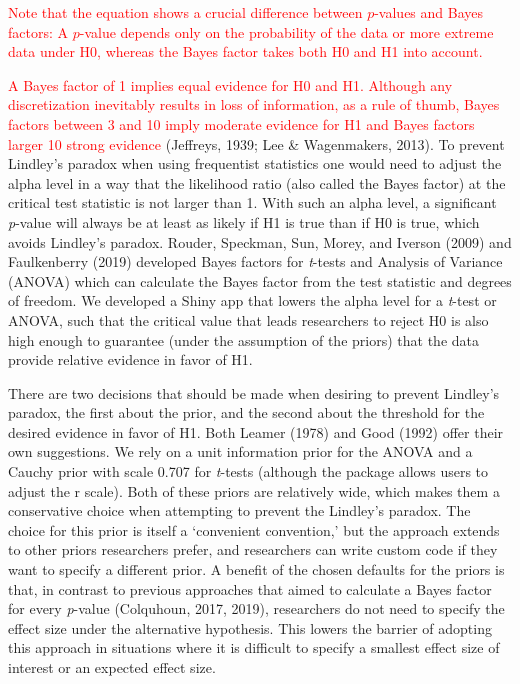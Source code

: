 \documentclass[
  english,
  ,man, a4paper,floatsintext]{apa6}
\begin{document}
\textcolor{red}{Note that the equation shows a crucial difference between $p$-values and Bayes factors: A $p$-value depends only on the probability of the data or more extreme data under H0, whereas the Bayes factor takes both H0 and H1 into account.}

\textcolor{red}{A Bayes factor of 1 implies equal evidence for H0 and H1. Although any discretization inevitably results in loss of information, as a rule of thumb, Bayes factors between 3 and 10 imply moderate evidence for H1 and Bayes factors larger 10 strong evidence} (Jeffreys, 1939; Lee \& Wagenmakers, 2013). To prevent Lindley's paradox when using frequentist statistics one would need to adjust the alpha level in a way that the likelihood ratio (also called the Bayes factor) at the critical test statistic is not larger than 1. With such an alpha level, a significant \emph{p}-value will always be at least as likely if H1 is true than if H0 is true, which avoids Lindley's paradox. Rouder, Speckman, Sun, Morey, and Iverson (2009) and Faulkenberry (2019) developed Bayes factors for \emph{t}-tests and Analysis of Variance (ANOVA) which can calculate the Bayes factor from the test statistic and degrees of freedom. We developed a Shiny app that lowers the alpha level for a \emph{t}-test or ANOVA, such that the critical value that leads researchers to reject H0 is also high enough to guarantee (under the assumption of the priors) that the data provide relative evidence in favor of H1.

There are two decisions that should be made when desiring to prevent Lindley's paradox, the first about the prior, and the second about the threshold for the desired evidence in favor of H1. Both Leamer (1978) and Good (1992) offer their own suggestions. We rely on a unit information prior for the ANOVA and a Cauchy prior with scale 0.707 for \emph{t}-tests (although the package allows users to adjust the r scale). Both of these priors are relatively wide, which makes them a conservative choice when attempting to prevent the Lindley's paradox. The choice for this prior is itself a `convenient convention,' but the approach extends to other priors researchers prefer, and researchers can write custom code if they want to specify a different prior. A benefit of the chosen defaults for the priors is that, in contrast to previous approaches that aimed to calculate a Bayes factor for every \emph{p}-value (Colquhoun, 2017, 2019), researchers do not need to specify the effect size under the alternative hypothesis. This lowers the barrier of adopting this approach in situations where it is difficult to specify a smallest effect size of interest or an expected effect size.
\end{document}
